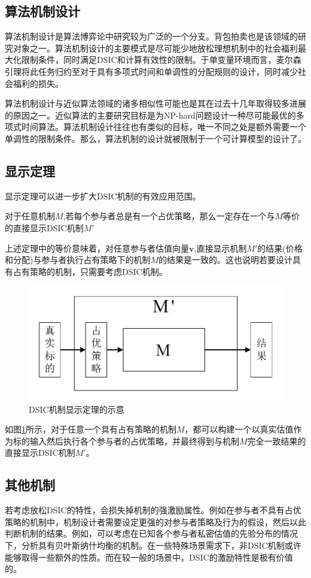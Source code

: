 \documentclass[promaster]{thesis-uestc}
\begin{document}
\subsection{算法机制设计}
算法机制设计是算法博弈论中研究较为广泛的一个分支。背包拍卖也是该领域的研究对象之一。算法机制设计的主要模式是尽可能少地放松理想机制中的社会福利最大化限制条件，同时满足DSIC和计算有效性的限制。于单变量环境而言，麦尔森引理将此任务归约至对于具有多项式时间和单调性的分配规则的设计，同时减少社会福利的损失。

算法机制设计与近似算法领域的诸多相似性可能也是其在过去十几年取得较多进展的原因之一。近似算法的主要研究目标是为NP-hard问题设计一种尽可能最优的多项式时间算法。算法机制设计往往也有类似的目标，唯一不同之处是额外需要一个单调性的限制条件。那么，算法机制的设计就被限制于一个可计算模型的设计了。

\subsection{显示定理}
显示定理可以进一步扩大DSIC机制的有效应用范围。
\begin{theorem}[DSIC机制的显示定理]
对于任意机制$M$,若每个参与者总是有一个占优策略，那么一定存在一个与$M$等价的直接显示DSIC机制$M'$
\end{theorem}

上述定理中的等价意味着，对任意参与者估值向量$\mathbf{v}$,直接显示机制$M'$的结果(价格和分配)与参与者执行占有策略下的机制$M$的结果是一致的。这也说明若要设计具有占有策略的机制，只需要考虑DSIC机制。

\begin{figure}[h]
    \includegraphics[width=350pt]{pic/revelation.pdf}
    \caption{DSIC机制显示定理的示意}
    \label{revelation}
\end{figure}
如图\ref{revelation}所示，对于任意一个具有占有策略的机制$M$，都可以构建一个以真实估值作为标的输入然后执行各个参与者的占优策略，并最终得到与机制$M$完全一致结果的直接显示DSIC机制$M'$。

\subsection{其他机制}
若考虑放松DSIC的特性，会损失掉机制的强激励属性。例如在参与者不具有占优策略的机制中，机制设计者需要设定更强的对参与者策略及行为的假设，然后以此判断机制的结果。例如，可以考虑在已知各个参与者私密估值的先验分布的情况下，分析具有贝叶斯纳什均衡的机制。在一些特殊场景需求下，非DSIC机制或许能够取得一些额外的性质。而在较一般的场景中，DSIC的激励特性是极有价值的。
\end{document}
